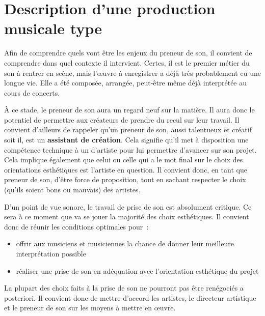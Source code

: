 \documentclass[
]{book}
\providecommand{\tightlist}{%
  \setlength{\itemsep}{0pt}\setlength{\parskip}{0pt}}
\begin{document}
\hypertarget{description-dune-production-musicale-type}{%
\chapter{Description d'une production musicale type}\label{description-dune-production-musicale-type}}

Afin de comprendre quels vont être les enjeux du preneur de son, il convient de comprendre dans quel contexte il intervient. Certes, il est le premier métier du son à rentrer en scène, mais l'œuvre à enregistrer a déjà très probablement eu une longue vie. Elle a été composée, arrangée, peut-être même déjà interprétée au cours de concerts.

À ce stade, le preneur de son aura un regard neuf sur la matière. Il aura donc le potentiel de permettre aux créateurs de prendre du recul sur leur travail. Il convient d'ailleurs de rappeler qu'un preneur de son, aussi talentueux et créatif soit il, est un \textbf{assistant de création}. Cela signifie qu'il met à disposition une compétence technique à un d'artiste pour lui permettre d'avancer sur son projet. Cela implique également que celui ou celle qui a le mot final sur le choix des orientations esthétiques est l'artiste en question. Il convient donc, en tant que preneur de son, d'être force de proposition, tout en sachant respecter le choix (qu'ils soient bons ou mauvais) des artistes.

D'un point de vue sonore, le travail de prise de son est absolument critique. Ce sera à ce moment que va se jouer la majorité des choix esthétiques. Il convient donc de réunir les conditions optimales pour~:

\begin{itemize}
\tightlist
\item
  offrir aux musiciens et musiciennes la chance de donner leur meilleure interprétation possible
\item
  réaliser une prise de son en adéquation avec l'orientation esthétique du projet
\end{itemize}

La plupart des choix faits à la prise de son ne pourront pas être renégociés a posteriori. Il convient donc de mettre d'accord les artistes, le directeur artistique et le preneur de son sur les moyens à mettre en œuvre.
\end{document}
